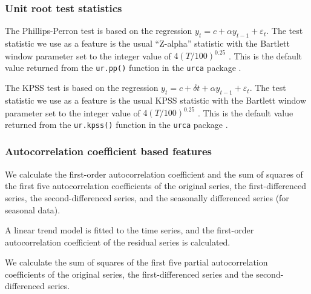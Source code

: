 \documentclass[11pt,a4paper,]{article}
\begin{document}
\hypertarget{unit-root-test-statistics}{%
\subsubsection*{Unit root test statistics}\label{unit-root-test-statistics}}

The Phillips-Perron test is based on the regression \(y_t= c + \alpha y_{t-1}+ \varepsilon_t\). The test statistic we use as a feature is the usual ``Z-alpha'' statistic with the Bartlett window parameter set to the integer value of \(4(T/100)^{0.25}\) \autocite{Pfaff2008}. This is the default value returned from the \texttt{ur.pp()} function in the \texttt{urca} package \autocite{pfaff2016package}.

The KPSS test is based on the regression \(y_t=c+\delta t+\alpha y_{t-1}+\varepsilon_t\). The test statistic we use as a feature is the usual KPSS statistic with the Bartlett window parameter set to the integer value of \(4(T/100)^{0.25}\) \autocite{Pfaff2008}. This is the default value returned from the \texttt{ur.kpss()} function in the \texttt{urca} package \autocite{pfaff2016package}.

\hypertarget{autocorrelation-coefficient-based-features}{%
\subsubsection*{Autocorrelation coefficient based features}\label{autocorrelation-coefficient-based-features}}

We calculate the first-order autocorrelation coefficient and the sum of squares of the first five autocorrelation coefficients of the original series, the first-differenced series, the second-differenced series, and the seasonally differenced series (for seasonal data).

A linear trend model is fitted to the time series, and the first-order autocorrelation coefficient of the residual series is calculated.

We calculate the sum of squares of the first five partial autocorrelation coefficients of the original series, the first-differenced series and the second-differenced series.

\printbibliography
\end{document}
